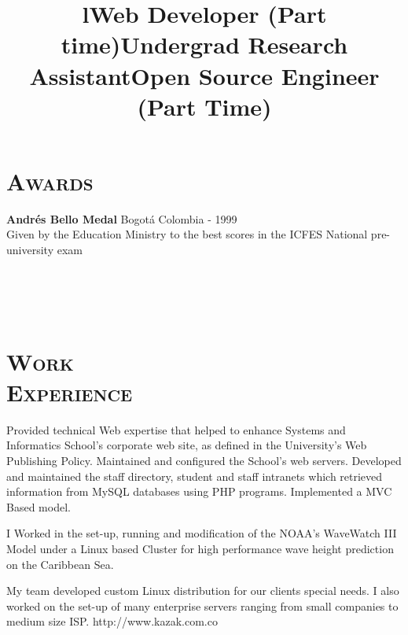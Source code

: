 \begin{resume}
\section{\textsc{Awards}}
\textbf{Andr\'{e}s Bello Medal} \hfill  Bogot\'{a} Colombia - 1999 \\
Given by the Education Ministry to the best scores in the ICFES National pre-university exam \hfill \\


\begin{formatb}
  \title{l}\\
 \\
  \body\\
\end{formatb}



\section{\textsc{Work\\ Experience}}

\title{\textbf{Web Developer} (Part time)}
\begin{position}
Provided technical Web expertise that helped to enhance Systems and Informatics School's corporate web site, 
as defined in the University's Web Publishing Policy. Maintained and configured the School's web servers. Developed and maintained the staff directory, student and staff intranets which retrieved information from MySQL databases using PHP programs. Implemented a MVC Based model.
\end{position}

\title{\textbf{Undergrad Research Assistant}}
\begin{position}
I Worked in the set-up, running and modification of the NOAA's WaveWatch III Model under a Linux based Cluster
for high performance wave height prediction on the Caribbean Sea.
\end{position}


\title{\textbf{Open Source Engineer} (Part Time)}
\begin{position}
My team developed custom  Linux distribution for our clients
special needs. I also worked on  the set-up of many enterprise
servers ranging from small companies to medium size ISP. http://www.kazak.com.co
\end{position}



\end{resume}
